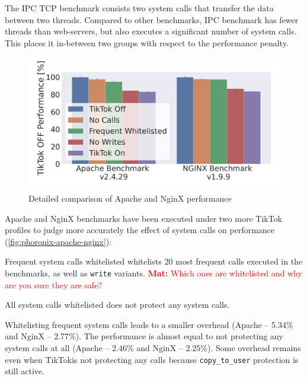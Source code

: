 \documentclass[conference]{IEEEtran}
\newcommand{\mat}[1]{\textcolor{red}{\textbf{Mat:} #1}}
\newcommand{\sysname}{TikTok}
\begin{document}
The IPC TCP benchmark consists two system calls that transfer the data between
two threads. Compared to other benchmarks, IPC benchmark has fewer threads than
web-servers, but also executes a significant number of system calls. This places
it in-between two groups with respect to the performance penalty.

\begin{figure}[]
  \centering
  \includegraphics[width=\linewidth]{graphs/apache-nginx-5.png}
  \caption{Detailed comparison of Apache and NginX performance}
  \label{fig:phoronix-apache-nginx}
\end{figure}

Apache and NginX benchmarks have been executed under two more \sysname{}
profiles to judge more accurately the effect of system calls on performance
(\autoref{fig:phoronix-apache-nginx}):

\begin{LaTeXdescription}
  \item[Frequent system calls whitelisted] whitelists 20 most frequent calls executed in the benchmarks, as well as \texttt{write} variants.
\mat{Which ones are whitelisted and why are you sure they are safe?}
  \item[All system calls whitelisted] does not protect any system calls.
\end{LaTeXdescription}

Whitelisting frequent system calls leads to a smaller overhead (Apache -- 5.34\% and
NginX -- 2.77\%). The performance is almost equal to not protecting any
system calls at all (Apache -- 2.46\% and NginX -- 2.25\%). Some overhead
remains even when \sysname is not protecting any calls because
\texttt{copy\_to\_user} protection is still active.
\end{document}
